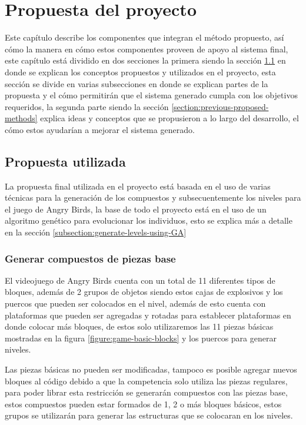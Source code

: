 \chapter{Propuesta del proyecto}
\label{chapter:proposed-method}

Este capítulo describe los componentes que integran el método propuesto, así
cómo la manera en cómo estos componentes proveen de apoyo al sistema final, este
capítulo está dividido en dos secciones la primera siendo la sección
\ref{section:used-method} en donde se explican los conceptos propuestos y
utilizados en el proyecto, esta sección se divide en varias subsecciones en
donde se explican partes de la propuesta y el cómo permitirán que el sistema
generado cumpla con los objetivos requeridos, la segunda parte siendo la sección
\ref{section:previous-proposed-methods} explica ideas y conceptos que se
propusieron a lo largo del desarrollo, el cómo estos ayudarían a mejorar el
sistema generado.

\section{Propuesta utilizada}
\label{section:used-method}

La propuesta final utilizada en el proyecto está basada en el uso de varias
técnicas para la generación de los compuestos y subsecuentemente los niveles
para el juego de Angry Birds, la base de todo el proyecto está en el uso de un
algoritmo genético para evolucionar los individuos, esto se explica más a
detalle en la sección \ref{subsection:generate-levels-using-GA}

\subsection{Generar compuestos de piezas base}
\label{subsection:generate-composites}

El videojuego de Angry Birds cuenta con un total de 11 diferentes tipos de
bloques, además de 2 grupos de objetos siendo estos cajas de explosivos y los
puercos que pueden ser colocados en el nivel, además de esto cuenta con
plataformas que pueden ser agregadas y rotadas para establecer plataformas en
donde colocar más bloques, de estos solo utilizaremos las 11 piezas básicas
mostradas en la figura \ref{figure:game-basic-blocks} y los puercos para generar
niveles.

Las piezas básicas no pueden ser modificadas, tampoco es posible agregar nuevos
bloques al código debido a que la competencia solo utiliza las piezas regulares,
para poder librar esta restricción se generarán compuestos con las piezas base,
estos compuestos pueden estar formados de 1, 2 o más bloques básicos, estos
grupos se utilizarán para generar las estructuras que se colocaran en los niveles.


